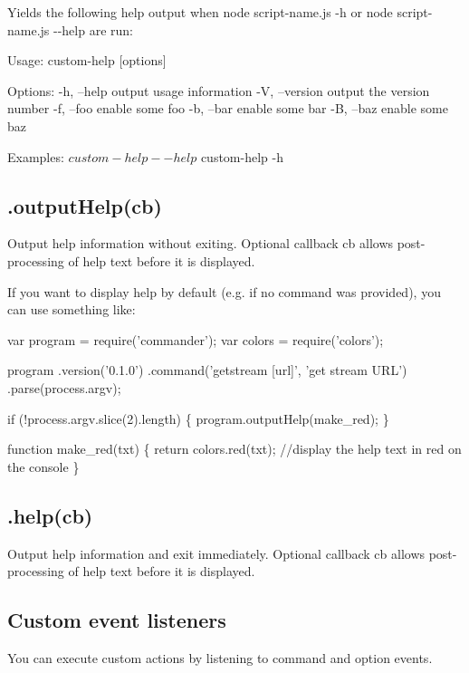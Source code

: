 Yields the following help output when {\ttfamily node script-\/name.\+js -\/h} or {\ttfamily node script-\/name.\+js -\/-\/help} are run\+:


\begin{DoxyCode}
Usage: custom-help [options]

Options:
  -h, --help     output usage information
  -V, --version  output the version number
  -f, --foo      enable some foo
  -b, --bar      enable some bar
  -B, --baz      enable some baz

Examples:
  $ custom-help --help
  $ custom-help -h
\end{DoxyCode}


\subsection*{.output\+Help(cb)}

Output help information without exiting. Optional callback cb allows post-\/processing of help text before it is displayed.

If you want to display help by default (e.\+g. if no command was provided), you can use something like\+:


\begin{DoxyCode}
var program = require('commander');
var colors = require('colors');

program
  .version('0.1.0')
  .command('getstream [url]', 'get stream URL')
  .parse(process.argv);

if (!process.argv.slice(2).length) \{
  program.outputHelp(make\_red);
\}

function make\_red(txt) \{
  return colors.red(txt); //display the help text in red on the console
\}
\end{DoxyCode}


\subsection*{.help(cb)}

Output help information and exit immediately. Optional callback cb allows post-\/processing of help text before it is displayed.

\subsection*{Custom event listeners}

You can execute custom actions by listening to command and option events.


